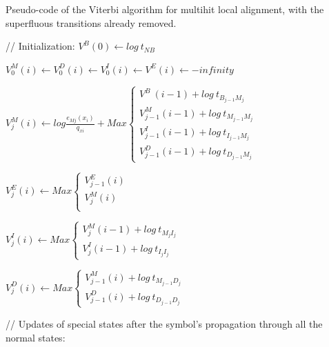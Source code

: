 \appendix


\begin{algorithm}[htb!]
\caption[Viterbi algorithm for multihit local alignment] {Pseudo-code of the Viterbi algorithm for multihit local alignment, with the superfluous transitions already removed.}
\label{code-viterbi}

\begin{algorithmic}

\State // Initialization:
\State	$  V^B (0) \gets log\ t_{N B}  $


	\State	 $ V^M_0(i)  \gets  V^D_0(i)  \gets  V^I_0(i)  \gets  V^E (i)  \gets  -infinity $


		\State	$ V^M_j(i) \gets log \frac{e_{Mj}(x_i) }{q_{xi}} + Max  
				\begin{cases}
					V^B \ (i-1)	    + log\ t_{B_{j-1} M_j} \\
					V^M_{j-1} (i-1) + log\ t_{M_{j-1} M_j}  \\
					V^I_{j-1} (i-1)  + log\ t_{I_{j-1} M_j}  \\
					V^D_{j-1} (i-1) + log\ t_{D_{j-1} M_j} 
				\end{cases} $


		\State	$ V^E_j (i) \gets  Max \begin{cases} 
						V^E_{j-1} (i) \\
						V^M_j(i) \\
						\end{cases} $
	   
		\State	$ V^I_j(i) \gets Max  
				\begin{cases}
					V^M_{j} (i-1) + log\ t_{M_{j} I_j}  \\
					V^I_{j} (i-1) + log\ t_{I_{j} I_j}
				\end{cases} $

		\State	$V^D_j(i) \gets Max \begin{cases}
					V^M_{j-1} (i) + log\ t_{M_{j-1} D_j}  \\
					V^D_{j-1} (i) + log\ t_{D_{j-1} D_j} 
				\end{cases} $ \\

	\EndFor

	
	\State // Updates of special states after the symbol's propagation through all the normal states:
	

\end{algorithmic}
\end{algorithm}
